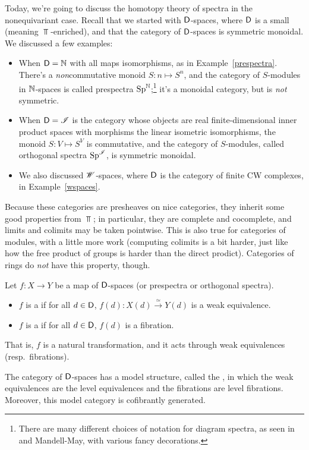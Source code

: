 Today, we're going to discuss the homotopy theory of spectra in the nonequivariant case. Recall that we started
with $\mathsf D$-spaces, where $\mathsf D$ is a small  (meaning $\Top$-enriched), and that the
category of $\mathsf D$-spaces is symmetric monoidal. We discussed a few
examples:
\begin{itemize}
	\item When $\mathsf D = \mathbb N$ with all maps isomorphisms, as in Example~\ref{prespectra}. There's a
	\emph{non}commutative monoid $S\colon n\mapsto S^n$, and the category of $S$-modules in $\mathbb N$-spaces is called
	prespectra $\mathrm{Sp}^\mathbb N$;\footnote{There are many different choices of notation for diagram spectra, as seen
	in~\cite{MMSS} and Mandell-May, with various fancy decorations.} it's a monoidal category, but is \emph{not}
	symmetric.
	\item When $\mathsf D = \mathscr I$ is the category whose objects are real finite-dimensional inner product spaces with
	morphisms the linear isometric isomorphisms, the monoid $S\colon V\mapsto S^V$ is commutative, and the category
	of $S$-modules, called orthogonal spectra $\mathrm{Sp}^\mathscr I$, is symmetric monoidal.
	\item We also discussed $\mathscr W$-spaces, where $\mathsf D$ is the category of finite CW complexes, in
	Example~\ref{wspaces}.
\end{itemize}
Because these categories are presheaves on nice categories, they inherit some good properties from $\Top$; in
particular, they are complete and cocomplete, and limits and colimits may be taken pointwise. This is also true for
categories of modules, with a little more work (computing colimits is a bit harder, just like how the free product
of groups is harder than the direct prodict). Categories of rings do \emph{not} have this property, though.
\begin{defn}
Let $f\colon X\to Y$ be a map of $\mathsf D$-spaces (or prespectra or orthogonal spectra).
\begin{itemize}
	\item $f$ is a  if for all $d\in\mathsf D$, $f(d)\colon X(d)\stackrel\simeq\to Y(d)$ is a
	weak equivalence.
	\item $f$ is a  if for all $d\in\mathsf D$, $f(d)$ is a fibration.
\end{itemize}
\end{defn}
That is, $f$ is a natural transformation, and it acts through weak equivalences (resp.\ fibrations).
\begin{thm}
The category of $\mathsf D$-spaces has a model structure, called the , in which the weak
equivalences are the level equivalences and the fibrations are level fibrations. Moreover, this model category is
cofibrantly generated.
\end{thm}
